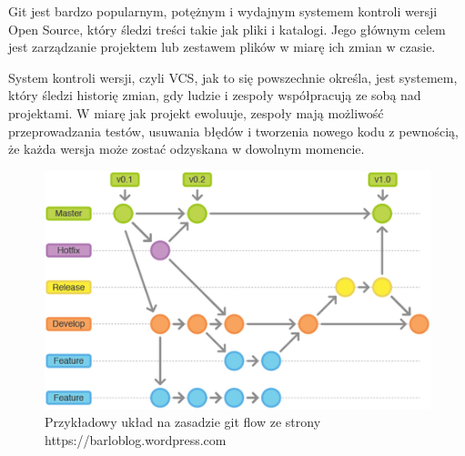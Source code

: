 Git jest bardzo popularnym, potężnym i wydajnym systemem kontroli wersji Open Source, który śledzi treści takie jak pliki i katalogi. Jego głównym celem jest zarządzanie projektem lub zestawem plików w miarę ich zmian w czasie.

System kontroli wersji, czyli VCS, jak to się powszechnie określa, jest systemem, który śledzi historię zmian, gdy ludzie i zespoły współpracują ze sobą nad projektami. W miarę jak projekt ewoluuje, zespoły mają możliwość przeprowadzania testów, usuwania błędów i tworzenia nowego kodu z pewnością, że każda wersja może zostać odzyskana w dowolnym momencie.

\begin{figure}[!ht]
    \centering
    \includegraphics[width=6in]{images/git.png}
    \caption{Przykładowy układ na zasadzie git flow ze strony https://barloblog.wordpress.com \label{fig:git}}
\end{figure}